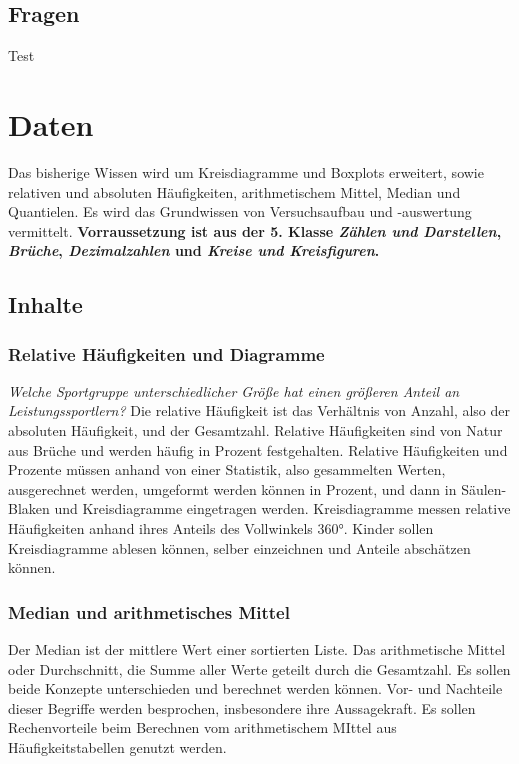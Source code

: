 \documentclass{article}
\begin{document}
\subsection{Fragen}
\begin{tcolorbox}[colback=blue!5!white,colframe=blue!25!black]
Test
\end{tcolorbox}
\newpage
\section{Daten}
Das bisherige Wissen wird um Kreisdiagramme und Boxplots erweitert, sowie relativen und absoluten Häufigkeiten, arithmetischem Mittel, Median und Quantielen. Es wird das Grundwissen von Versuchsaufbau und -auswertung vermittelt.
\textbf{Vorraussetzung ist aus der 5. Klasse \textit{Zählen und Darstellen}, \textit{Brüche}, \textit{Dezimalzahlen} und  \textit{Kreise und Kreisfiguren}.}
\subsection{Inhalte}
\subsubsection*{Relative Häufigkeiten und Diagramme}
\textit{Welche Sportgruppe unterschiedlicher Größe hat einen größeren Anteil an Leistungssportlern?}
Die relative Häufigkeit ist das Verhältnis von Anzahl, also der absoluten Häufigkeit, und der Gesamtzahl.
Relative Häufigkeiten sind von Natur aus Brüche und werden häufig in Prozent festgehalten.
Relative Häufigkeiten und Prozente müssen anhand von einer Statistik, also gesammelten Werten, ausgerechnet werden, umgeformt werden können in Prozent, und dann in Säulen- Blaken und Kreisdiagramme eingetragen werden.
Kreisdiagramme messen relative Häufigkeiten anhand ihres Anteils des Vollwinkels $360°$.   
Kinder sollen Kreisdiagramme ablesen können, selber einzeichnen und Anteile abschätzen können.
\subsubsection*{Median und arithmetisches Mittel}
Der Median ist der mittlere Wert einer sortierten Liste. Das arithmetische Mittel oder Durchschnitt, die Summe aller Werte geteilt durch die Gesamtzahl.
Es sollen beide Konzepte unterschieden und berechnet werden können. Vor- und Nachteile dieser Begriffe werden besprochen, insbesondere ihre Aussagekraft.
Es sollen Rechenvorteile beim Berechnen vom arithmetischem MIttel aus Häufigkeitstabellen genutzt werden.
\end{document}
